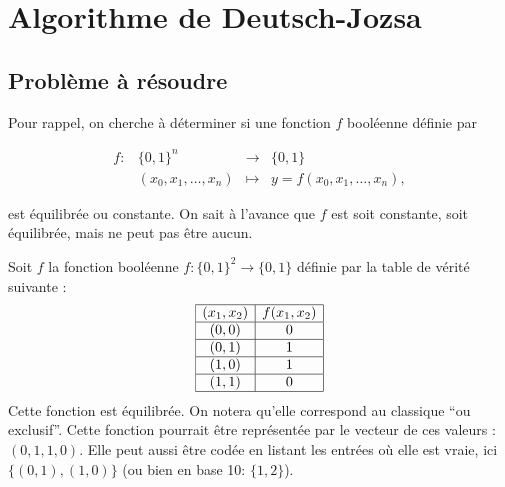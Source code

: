 \chapter{Algorithme de Deutsch-Jozsa}

\section{Problème à résoudre}

Pour rappel, on cherche à déterminer si une fonction $f$ booléenne définie par

\[
  \begin{array}{llll}
    f :  &  \{0, 1\}^n              & \to       & \{ 0, 1 \} \\
         &  (x_0, x_1, \dots , x_n) & \mapsto   &  y = f(x_0, x_1, \dots , x_n), 
  \end{array}  
\]

est équilibrée ou constante. On sait à l'avance que $f$ est soit constante, soit équilibrée, mais ne peut pas être aucun.





\begin{ex}
  Soit $f$ la fonction booléenne $f : \{0,1\}^2 \to \{0,1\}$ définie
  par la table de vérité suivante :
\[
  \begin{array}{|c|c|}
    \hline
   (x_1, x_2) & f(x_1,x_2) \\
    \hline
    (0,0) & 0 \\
    \hline
    (0,1) & 1 \\
    \hline
    (1,0) & 1 \\
    \hline
    (1,1) & 0 \\
    \hline
  \end{array}
\]
Cette fonction est équilibrée. On notera qu'elle correspond au
classique ``ou exclusif''. Cette fonction pourrait être représentée
par le vecteur de ces valeurs : $(0,1,1,0)$. Elle peut aussi être
codée en listant les entrées où elle est vraie, ici $\{(0,1),(1,0)\}$ (ou bien en base 10: $\{1, 2\}$).
\end{ex}

